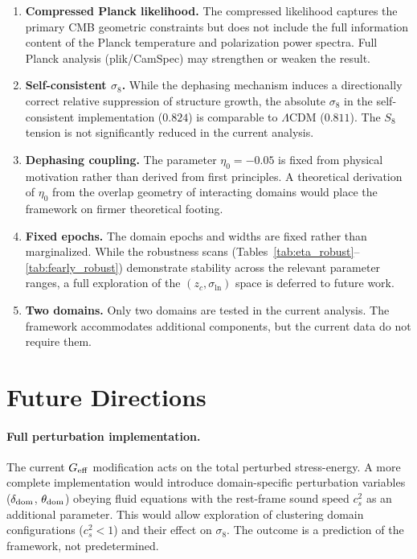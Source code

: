 \documentclass[aps,prd,twocolumn,superscriptaddress,nofootinbib]{revtex4-2}
\newcommand{\Geff}{G_{\rm eff}}
\begin{document}
\begin{enumerate}
\item \textbf{Compressed Planck likelihood.} The compressed
likelihood captures the primary CMB geometric constraints but
does not include the full information content of the Planck
temperature and polarization power spectra. Full Planck analysis
(plik/CamSpec) may strengthen or weaken the result.

\item \textbf{Self-consistent $\sigma_8$.} While the dephasing
mechanism induces a directionally correct relative suppression
of structure growth, the absolute $\sigma_8$ in the self-consistent
implementation ($0.824$) is comparable to $\Lambda$CDM ($0.811$).
The $S_8$ tension is not significantly reduced in the current
analysis.

\item \textbf{Dephasing coupling.} The parameter $\eta_0 = -0.05$
is fixed from physical motivation rather than derived from first
principles. A theoretical derivation of $\eta_0$ from the overlap
geometry of interacting domains would place the framework on
firmer theoretical footing.

\item \textbf{Fixed epochs.} The domain epochs and widths are
fixed rather than marginalized. While the robustness scans
(Tables~\ref{tab:eta_robust}--\ref{tab:fearly_robust})
demonstrate stability across the relevant parameter ranges, a
full exploration of the $(z_c, \sigma_{\ln})$ space is deferred
to future work.

\item \textbf{Two domains.} Only two domains are tested in the
current analysis. The framework accommodates additional components,
but the current data do not require them.
\end{enumerate}


\section{Future Directions}
\label{sec:future}

\paragraph{Full perturbation implementation.}
The current $\Geff$ modification acts on the total perturbed
stress-energy. A more complete implementation would introduce
domain-specific perturbation variables ($\delta_{\rm dom}$,
$\theta_{\rm dom}$) obeying fluid equations with the rest-frame
sound speed $c_s^2$ as an additional parameter. This would allow
exploration of clustering domain configurations ($c_s^2 < 1$)
and their effect on $\sigma_8$. The outcome is a prediction of the
framework, not predetermined.
\end{document}
